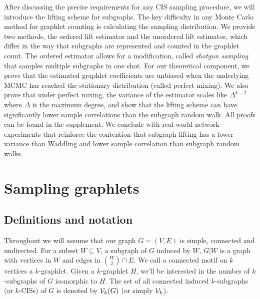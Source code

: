     After discussing the precise requirements for any CIS sampling procedure, we will introduce the lifting scheme for subgraphs.
    The key difficulty in any Monte Carlo method for graphlet counting is calculating the sampling distribution.
    We provide two methods, the ordered lift estimator and the unordered lift estimator, which differ in the way that subgraphs are represented and counted in the graphlet count.
    The ordered estimator allows for a modification, called {\em shotgun sampling} that samples multiple subgraphs in one shot. 
    For our theoretical component, we prove that the estimated graphlet coefficients are unbiased when the underlying MCMC has reached the stationary distribution (called perfect mixing).
    We also prove that under perfect mixing, the variance of the estimator scales like $\Delta^{k-2}$ where $\Delta$ is the maximum degree, and show that the lifting scheme can have significantly lower sample correlations than the subgraph random walk.
    All proofs can be found in the supplement.
    We conclude with real-world network experiments that reinforce the contention that subgraph lifting has a lower variance than Waddling and lower sample correlation than subgraph random walks.

	\section{Sampling graphlets}

	\subsection{Definitions and notation}
	
	Throughout we will assume that our graph $G = (V,E)$ is simple, connected and undirected. 
	For a subset $W \subseteq V$, a subgraph of $G$ induced by $W$, $G|W$ is a graph with vertices in $W$ and edges in $\binom{W}{2}\cap E$. 
	We call a connected motif on $k$ vertices a $k$-graphlet.
    Given a $k$-graphlet $H$, we'll be interested in the number of $k$-subgraphs of $G$ isomorphic to $H$.
	The set of all connected induced $k$-subgraphs (or $k$-CISs) of $G$ is denoted by $\mathcal{V}_k(G)$ (or simply $\mathcal{V}_k$).
	
